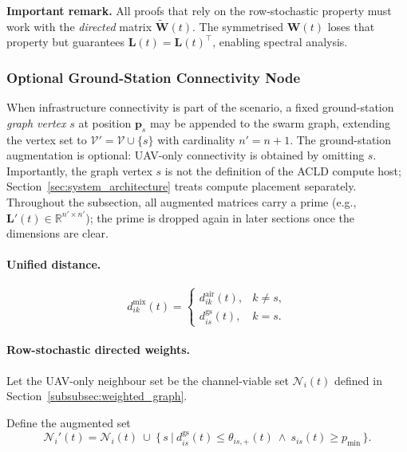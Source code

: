 \documentclass[preprint,12pt]{elsarticle}
\theoremstyle{definition}\newtheorem{definition}{Definition}
\theoremstyle{plain}\newtheorem{theorem}{Theorem}
\theoremstyle{plain}\newtheorem{lemma}{Lemma}
\theoremstyle{plain}\newtheorem{corollary}{Corollary}
\theoremstyle{plain}\newtheorem{assumption}{Assumption}
\theoremstyle{remark}\newtheorem{remark}[theorem]{Remark}
\begin{document}
\medskip\noindent
\textbf{Important remark.}
All proofs that rely on the row-stochastic property must work with the \emph{directed} matrix \(\tilde{\boldsymbol W}(t)\).  The symmetrised \(\boldsymbol W(t)\) loses that property but guarantees \(\boldsymbol L(t)=\boldsymbol L(t)^\top\), enabling spectral analysis.

\subsubsection{Optional Ground-Station Connectivity Node}
\label{subsubsec:central}

When infrastructure connectivity is part of the scenario, a fixed ground-station \emph{graph vertex} \(s\) at position \(\boldsymbol p_s\) may be appended to the swarm graph, extending the vertex set to \(\mathcal V'=\mathcal V\cup\{s\}\) with cardinality \(n'=n+1\). The ground-station augmentation is optional: UAV-only connectivity is obtained by omitting \(s\). Importantly, the graph vertex \(s\) is not the definition of the ACLD compute host; Section~\ref{sec:system_architecture} treats compute placement separately. Throughout the subsection, all augmented matrices carry a prime (e.g., \(\boldsymbol L'(t)\in\mathbb R^{n'\times n'}\)); the prime is dropped again in later sections once the dimensions are clear.

\paragraph{Unified distance.}
\begin{equation}
  d^{\text{mix}}_{ik}(t)=
  \begin{cases}
    d^{\text{air}}_{ik}(t), & k\neq s,\\[4pt]
    d^{\text{gs}}_{is}(t),  & k=s.
  \end{cases}
  \label{eq:dmix}
\end{equation}

\paragraph{Row-stochastic directed weights.}
Let the UAV-only neighbour set be the channel-viable set $\mathcal N_i(t)$ defined in Section~\ref{subsubsec:weighted_graph}.

Define the augmented set
\[
  \mathcal N_i'(t)
  = \mathcal N_i(t)\ \cup\
    \bigl\{\,s\ \big|\ d^{\text{gs}}_{is}(t)\le\theta_{is,+}(t)\ \land\ s_{is}(t)\ge p_{\min}\,\bigr\}.
\]
\end{document}
